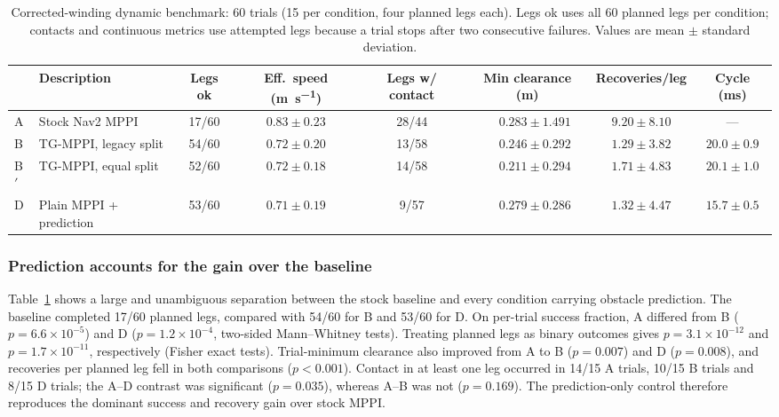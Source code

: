 \documentclass[journal]{IEEEtran}
\begin{document}
\begin{table}[t]
\centering
\caption{Corrected-winding dynamic benchmark: 60 trials (15 per condition,
four planned legs each). Legs ok uses all 60 planned legs per condition;
contacts and continuous metrics use attempted legs because a trial stops after
two consecutive failures. Values are mean $\pm$ standard deviation.}
\label{tab:main}
\begin{tabular}{llcccccc}
\toprule
 & Description & Legs ok & Eff.\ speed (\si{\metre\per\second}) & Legs w/ contact & Min clearance (\si{\metre}) & Recoveries/leg & Cycle (\si{\milli\second}) \\
\midrule
A   & Stock Nav2 MPPI            & 17/60 & $0.83 \pm 0.23$ & 28/44 & $\phantom{-}0.283 \pm 1.491$ & $9.20 \pm 8.10$ & --- \\
B   & TG-MPPI, legacy split      & 54/60 & $0.72 \pm 0.20$ & 13/58 & $\phantom{-}0.246 \pm 0.292$ & $1.29 \pm 3.82$ & $20.0 \pm 0.9$ \\
B$'$& TG-MPPI, equal split       & 52/60 & $0.72 \pm 0.18$ & 14/58 & $\phantom{-}0.211 \pm 0.294$ & $1.71 \pm 4.83$ & $20.1 \pm 1.0$ \\
D   & Plain MPPI + prediction    & 53/60 & $0.71 \pm 0.19$ & \phantom{0}9/57 & $\phantom{-}0.279 \pm 0.286$ & $1.32 \pm 4.47$ & $15.7 \pm 0.5$ \\
\bottomrule
\end{tabular}
\end{table}

\subsubsection{Prediction accounts for the gain over the baseline}
Table~\ref{tab:main} shows a large and unambiguous separation between the stock
baseline and every condition carrying obstacle prediction. The baseline
completed 17/60 planned legs, compared with 54/60 for B and 53/60 for D.
On per-trial success fraction, A differed from B ($p=6.6\times10^{-5}$) and D
($p=1.2\times10^{-4}$, two-sided Mann--Whitney tests). Treating planned legs as
binary outcomes gives $p=3.1\times10^{-12}$ and
$p=1.7\times10^{-11}$, respectively (Fisher exact tests). Trial-minimum
clearance also improved from A to B ($p=0.007$) and D ($p=0.008$), and
recoveries per planned leg fell in both comparisons ($p<0.001$). Contact in at
least one leg occurred in 14/15 A trials, 10/15 B trials and 8/15 D trials; the
A--D contrast was significant ($p=0.035$), whereas A--B was not ($p=0.169$).
The prediction-only control therefore reproduces the dominant success and
recovery gain over stock MPPI.
\end{document}
